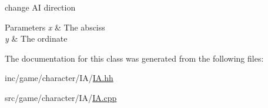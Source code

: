 change AI direction 


\begin{DoxyParams}{Parameters}
{\em x} & The absciss \\
\hline
{\em y} & The ordinate \\
\hline
\end{DoxyParams}


The documentation for this class was generated from the following files\+:\begin{DoxyCompactItemize}
\item 
inc/game/character/\+I\+A/\hyperlink{IA_8hh}{I\+A.\+hh}\item 
src/game/character/\+I\+A/\hyperlink{IA_8cpp}{I\+A.\+cpp}\end{DoxyCompactItemize}
